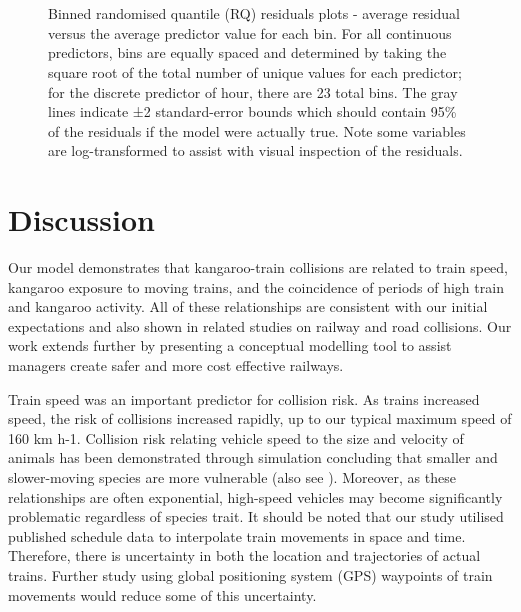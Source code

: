 \begin{figure*}[htp]
  \captionsetup[subfloat]{farskip=-2pt,nearskip=-2pt}
  \centering
  \\
  \\
  \caption[]{Binned randomised quantile (RQ) residuals plots - average residual versus the average predictor value for each bin. For all continuous predictors, bins are equally spaced and determined by taking the square root of the total number of unique values for each predictor; for the discrete predictor of hour, there are 23 total bins. The gray lines indicate ±2 standard-error bounds which should contain 95\% of the residuals if the model were actually true. Note some variables are log-transformed to assist with visual inspection of the residuals.}
  \label{train_brq}
\end{figure*}

\section{Discussion}

Our model demonstrates that kangaroo-train collisions are related to train speed, kangaroo exposure to moving trains, and the coincidence of periods of high train and kangaroo activity.  All of these relationships are consistent with our initial expectations and also shown in related studies on railway \citep{gund98} and road \citep{lao11,roge12} collisions. Our work extends further by presenting a conceptual modelling tool to assist managers create safer and more cost effective railways.

Train speed was an important predictor for collision risk.  As trains increased speed, the risk of collisions increased rapidly, up to our typical maximum speed of 160 km h-1.  Collision risk relating vehicle speed to the size and velocity of animals has been demonstrated through simulation \citep{jaar06} concluding that smaller and slower-moving species are more vulnerable (also see \cite{fahr09}). Moreover, as these relationships are often exponential, high-speed vehicles may become significantly problematic regardless of species trait. It should be noted that our study utilised published schedule data to interpolate train movements in space and time. Therefore, there is uncertainty in both the location and trajectories of actual trains. Further study using global positioning system (GPS) waypoints of train movements would reduce some of this uncertainty.


